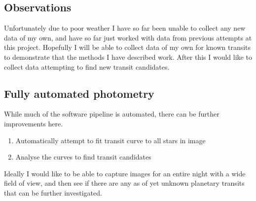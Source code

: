 
\subsection{Observations}

Unfortunately due to poor weather I have so far been unable to collect any new data of my own, and have so far just worked with data from previous attempts at this project. Hopefully I will be able to collect data of my own for known transits to demonstrate that the methods I have described work. After this I would like to collect data attempting to find new transit candidates.

\subsection{Fully automated photometry}

While much of the software pipeline is automated, there can be further improvements here.
\begin{enumerate}
    \item Automatically attempt to fit transit curve to all stars in image
    \item Analyse the curves to find transit candidates
\end{enumerate}

Ideally I would like to be able to capture images for an entire night with a wide field of view, and then see if there are any as of yet unknown planetary transits that can be further investigated.